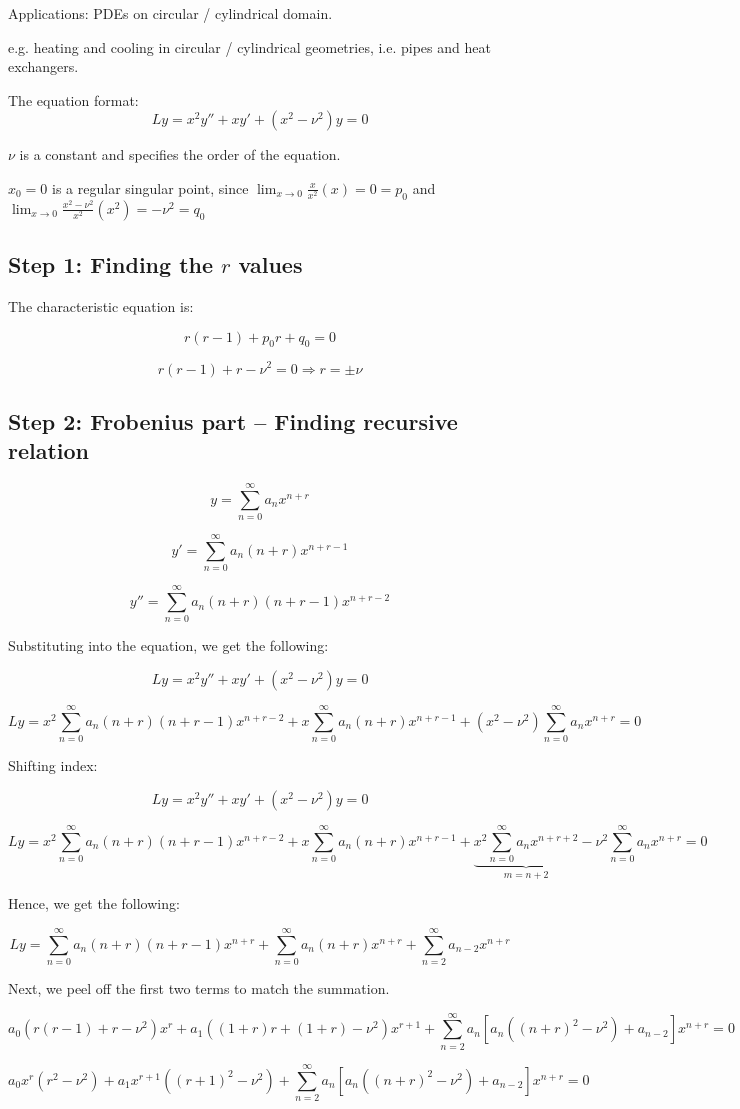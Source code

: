 \documentclass{article}
\begin{document}
Applications: PDEs on circular / cylindrical domain. 

e.g. heating and cooling in circular / cylindrical geometries, i.e. pipes and heat exchangers. 

\hfill

The equation format:
\begin{equation}
    \label{Bessel's Equation}
    Ly = x^2 y'' + xy' + \left(x^2 - \nu^2 \right) y = 0
\end{equation}

$\nu$ is a constant and specifies the order of the equation. 

$x_0 = 0$ is a regular singular point, since $\lim_{x \to 0} \frac{x}{x^2} (x) = 0 = p_0$ and $\lim_{x \to 0} \frac{x^2 - \nu^2}{x^2}(x^2) = - \nu^2 = q_0$

\subsection{Step 1: Finding the $r$ values}

The characteristic equation is:

$$r(r-1) + p_0 r + q_0 = 0$$

$$r(r-1) + r - \nu^2 = 0 \Rightarrow r = \pm \nu$$

\subsection{Step 2: Frobenius part -- Finding recursive relation}

$$y = \sum_{n = 0}^\infty a_n x^{n+r}$$

$$y' = \sum_{n =0}^{\infty} a_n (n+r)x^{n+r-1}$$

$$y'' = \sum_{n=0}^{\infty} a_n (n+r) (n+r-1) x^{n+r-2}$$

Substituting into the equation, we get the following:

$$Ly = x^2 y'' + xy' + \left(x^2 - \nu^2 \right) y = 0$$

$$Ly = x^2 \sum_{n=0}^{\infty} a_n (n+r) (n+r-1) x^{n+r-2} + x\sum_{n =0}^{\infty} a_n (n+r)x^{n+r-1} + \left(x^2 - \nu^2 \right) \sum_{n = 0}^\infty a_n x^{n+r} = 0$$

Shifting index:

$$Ly = x^2 y'' + xy' + \left(x^2 - \nu^2 \right) y = 0$$

$$Ly = x^2 \sum_{n=0}^{\infty} a_n (n+r) (n+r-1) x^{n+r-2} + x\sum_{n =0}^{\infty} a_n (n+r)x^{n+r-1} + \underbrace{x^2\sum_{n = 0}^\infty a_n x^{n+r+2}}_{m = n+2} - \nu^2\sum_{n = 0}^\infty a_n x^{n+r} = 0$$

Hence, we get the following:

$$Ly = \sum_{n = 0}^\infty a_n (n+r)(n+r-1) x^{n+r} + \sum_{n=0}^\infty a_n (n+r) x^{n+r} + \sum_{n = 2}^\infty a_{n-2} x^{n+r}$$

Next, we peel off the first two terms to match the summation. 

$$a_0 (r(r-1) + r - \nu^2) x^r + a_1 ((1+r) r + (1+r) - \nu^2) x^{r+1} + \sum_{n = 2}^\infty a_n \left[ a_n \left( (n+r)^2 - \nu^2 \right) + a_{n-2} \right] x^{n+r} = 0$$

$$a_0 x^r (r^2 - \nu^2) + a_1 x^{r+1} \left((r+1)^2 - \nu^2 \right)  + \sum_{n = 2}^\infty a_n \left[ a_n \left( (n+r)^2 - \nu^2 \right) + a_{n-2} \right] x^{n+r} = 0$$
\end{document}
